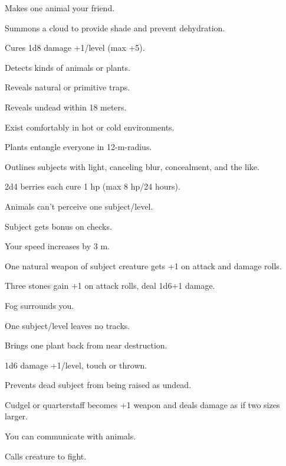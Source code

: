 Makes one animal your friend.

 Summons a cloud to provide shade and prevent dehydration.

 Cures 1d8 damage +1/level (max +5).

 Detects kinds of animals or plants.

 Reveals natural or primitive traps.

 Reveals undead within 18 meters.

 Exist comfortably in hot or cold environments.

 Plants entangle everyone in 12-m-radius.

 Outlines subjects with light, canceling blur, concealment, and the like.

 2d4 berries each cure 1 hp (max 8 hp/24 hours).

 Animals can't perceive one subject/level.

 Subject gets bonus on  checks.

 Your speed increases by 3 m.

 One natural weapon of subject creature gets +1 on attack and damage rolls.

 Three stones gain +1 on attack rolls, deal 1d6+1 damage.

 Fog surrounds you.

 One subject/level leaves no tracks.

 Brings one plant back from near destruction.

 1d6 damage +1/level, touch or thrown.

 Prevents dead subject from being raised as undead.

 Cudgel or quarterstaff becomes +1 weapon and deals damage as if two sizes larger.

 You can communicate with animals.

 Calls creature to fight.



